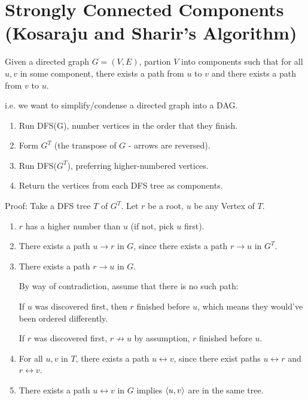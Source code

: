     \section{Strongly Connected Components (Kosaraju and Sharir's Algorithm)}
        Given a directed graph $G = (V, E)$, partion $V$ into components such
        that for all $u, v$ in some component, there exists a path from $u$ to
        $v$ and there exists a path from $v$ to $u$.

        i.e. we want to simplify/condense a directed graph into a DAG.

        \begin{enumerate}
            \item Run DFS(G), number vertices in the order that they finish.
            \item Form $G^T$ (the transpose of $G$ - arrows are reversed).
            \item Run DFS($G^T$), preferring higher-numbered vertices.
            \item Return the vertices from each DFS tree as components.
        \end{enumerate}
        Proof:
        Take a DFS tree $T$ of $G^T$. Let $r$ be a root, $u$ be any
        Vertex of $T$.
        \begin{enumerate}
            \item $r$ has a higher number than $u$ (if not, pick $u$ first).
            \item There exists a path $u \to r$ in $G$, since there exists a
            path $r \to u$ in $G^T$.
            \item There exists a path $r \to u$ in $G$.

                By way of contradiction, assume that there is no such path:

                    If $u$ was discovered first, then $r$ finished before $u$,
                        which means they would've been ordered differently.

                    If $r$ was discovered first, $r \not \to u$ by assumption,
                    $r$ finished before $u$.
            \item For all $u, v$ in $T$, there exists a path
            $u \leftrightarrow v$, since there exist paths $u \leftrightarrow r$
            and $r \leftrightarrow v$.
            \item There exists a path $u \leftrightarrow v$ in $G$ implies
            $\left \langle u, v \right \rangle $ are in the same tree.
        \end{enumerate}
